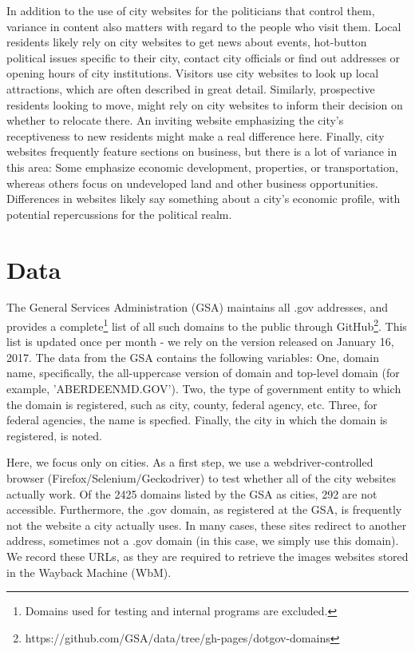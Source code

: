 \documentclass[11pt]{article}
\begin{document}
In addition to the use of city websites for the politicians that control them, variance in content also matters  with regard to the people who visit them. Local residents likely rely on city websites to get news about events, hot-button political issues specific to their city, contact city officials or find out addresses or opening hours of city institutions. Visitors use city websites to look up local attractions, which are often described in great detail. Similarly, prospective residents looking to move, might rely on city websites to inform their decision on whether to relocate there. An inviting website emphasizing the city's receptiveness to new residents might make a real difference here. Finally, city websites frequently feature sections on business, but there is a lot of variance in this area: Some emphasize economic development, properties, or transportation, whereas others focus on undeveloped land and other business opportunities. Differences in websites likely say something about a city's economic profile, with potential repercussions for the political realm.

\section{Data}
The General Services Administration (GSA) maintains all .gov addresses, and provides a complete\footnote{Domains used for testing and internal programs are excluded.} list of all such domains to the public through GitHub\footnote{https://github.com/GSA/data/tree/gh-pages/dotgov-domains}. This list is updated once per month - we rely on the version released on January 16, 2017. The data from the GSA contains the following variables: One, domain name, specifically, the all-uppercase version of domain and top-level domain (for example, 'ABERDEENMD.GOV'). Two, the type of government entity to which the domain is registered, such as city, county, federal agency, etc. Three, for federal agencies, the name is specfied. Finally, the city in which the domain is registered, is noted.

Here, we focus only on cities. As a first step, we use a webdriver-controlled browser (Firefox/Selenium/Geckodriver) to test whether all of the city websites actually work. Of the 2425 domains listed by the GSA as cities, 292 are not accessible. Furthermore, the .gov domain, as registered at the GSA, is frequently not the website a city actually uses. In many cases, these sites redirect to another address, sometimes not a .gov domain (in this case, we simply use this domain). We record these URLs, as they are required to retrieve the images websites stored in the Wayback Machine (WbM).
\end{document}
